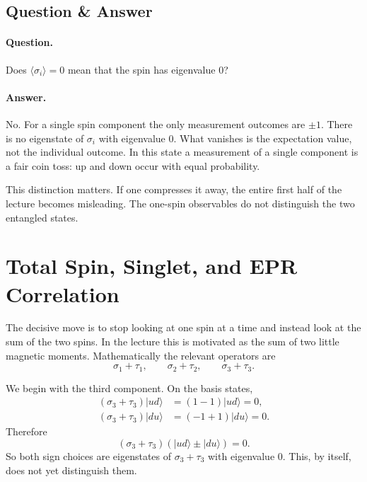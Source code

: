 \subsection{Question \& Answer}

\paragraph{Question.} Does \(\langle \sigma_i\rangle=0\) mean that the spin has eigenvalue \(0\)?

\paragraph{Answer.} No. For a single spin component the only measurement outcomes are \(\pm 1\). There is no eigenstate of \(\sigma_i\) with eigenvalue \(0\). What vanishes is the expectation value, not the individual outcome. In this state a measurement of a single component is a fair coin toss: up and down occur with equal probability.

This distinction matters. If one compresses it away, the entire first half of the lecture becomes misleading. The one-spin observables do not distinguish the two entangled states.

\section{Total Spin, Singlet, and EPR Correlation}

The decisive move is to stop looking at one spin at a time and instead look at the sum of the two spins. In the lecture this is motivated as the sum of two little magnetic moments. Mathematically the relevant operators are
\[
\sigma_1+\tau_1,\qquad
\sigma_2+\tau_2,\qquad
\sigma_3+\tau_3.
\]

We begin with the third component. On the basis states,
\begin{align}
(\sigma_3+\tau_3)|ud\rangle &= (1-1)|ud\rangle = 0, \\
(\sigma_3+\tau_3)|du\rangle &= (-1+1)|du\rangle = 0.
\end{align}
Therefore
\begin{equation}
(\sigma_3+\tau_3)(|ud\rangle \pm |du\rangle)=0.
\end{equation}
So both sign choices are eigenstates of \(\sigma_3+\tau_3\) with eigenvalue \(0\). This, by itself, does not yet distinguish them.

